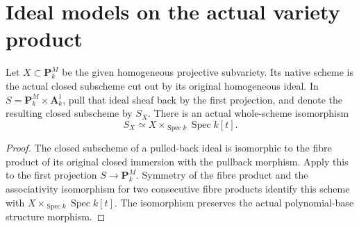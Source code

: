 \section{Ideal models on the actual variety product}

\begin{definition}
\label{def:pl-native-variety-product}
\leanok
Let $X\subset\mathbf P^M_k$ be the given homogeneous projective subvariety.
Its native scheme is the actual closed subscheme cut out by its original
homogeneous ideal.  In $S=\mathbf P^M_k\times\mathbf A^1_k$, pull that
ideal sheaf back by the first projection, and denote the resulting closed
subscheme by $S_X$.  There is an actual whole-scheme isomorphism
\[
 S_X\simeq X\times_{\operatorname{Spec}k}\operatorname{Spec}k[t].
\]
\end{definition}
\begin{proof}
The closed subscheme of a pulled-back ideal is isomorphic to the fibre
product of its original closed immersion with the pullback morphism.
Apply this to the first projection $S\to\mathbf P^M_k$.  Symmetry of the
fibre product and the associativity isomorphism for two consecutive fibre
products identify this scheme with
$X\times_{\operatorname{Spec}k}\operatorname{Spec}k[t]$.
The isomorphism preserves the actual polynomial-base structure morphism.
\end{proof}

